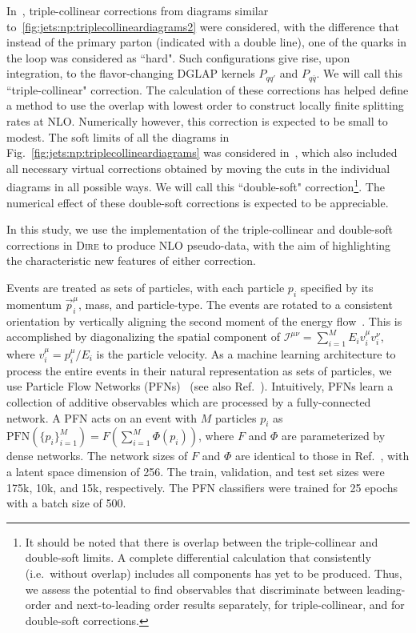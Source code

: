 In~\cite{Hoche:2017iem}, triple-collinear corrections from diagrams
similar to~\ref{fig:jets:np:triplecollineardiagrams2} were considered, with
the difference that instead of the primary parton (indicated with a double 
line), one of the quarks in the loop was considered as ``hard". Such
configurations give rise, upon integration, to the flavor-changing 
DGLAP kernels $P_{qq'}$ and $P_{q\bar q}$. We will call this 
``triple-collinear" correction. The calculation of these corrections has
helped define a method to use the overlap with lowest order to construct 
locally finite splitting rates at NLO. Numerically however, this correction is 
expected to be small to modest.
The soft limits of all the diagrams in Fig.~\ref{fig:jets:np:triplecollineardiagrams}
was considered in~\cite{Dulat:2018vuy}, which also included all necessary 
virtual corrections obtained by moving the cuts in the individual diagrams in 
all possible ways. We will call this ``double-soft" correction\footnote{
It should be noted that there is overlap between the
triple-collinear and double-soft limits. A complete differential calculation 
that consistently (i.e.\ without overlap) includes all components has yet
to be produced. Thus, we assess the potential to find observables
that discriminate between leading-order and next-to-leading order
results separately, for triple-collinear, and for double-soft corrections.}. 
The numerical effect of these double-soft corrections is expected to be appreciable.

In this study, we use the implementation of the triple-collinear and 
double-soft corrections in \textsc{Dire} to produce NLO pseudo-data, with the aim
of highlighting the characteristic new features of either correction.

Events are treated as sets of particles, with each particle $p_i$ specified by its momentum $\vec p_i^\mu$, mass, and particle-type.
%
The events are rotated to a consistent orientation by vertically aligning the second moment of the energy flow~\cite{Komiske:2019asc}.
%
This is accomplished by diagonalizing the spatial component of $\mathcal I^{\mu\nu} = \sum_{i=1}^M E_i v_i^\mu v_i^\nu$, where $v_i^\mu = p_i^\mu/E_i$ is the particle velocity.
As a machine learning architecture to process the entire events in their natural representation as sets of particles, we use Particle Flow Networks (PFNs)~\cite{Komiske:2018cqr} (see also Ref.~\cite{DBLP:conf/nips/ZaheerKRPSS17}).
%
Intuitively, PFNs learn a collection of additive observables which are processed by a fully-connected network.
%
A PFN acts on an event with $M$ particles $p_i$ as $\text{PFN}(\{p_i\}_{i=1}^M) = F\left(\sum_{i=1}^M \Phi(p_i)\right)$, where $F$ and $\Phi$ are parameterized by dense networks.
%
The network sizes of $F$ and $\Phi$ are identical to those in Ref.~\cite{Komiske:2018cqr}, with a latent space dimension of 256.
%
The train, validation, and test set sizes were 175k, 10k, and 15k, respectively.
%
The PFN classifiers were trained for 25 epochs with a batch size of 500.

